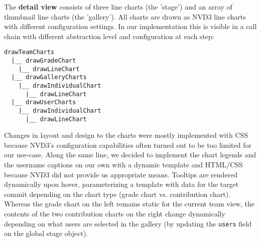 \documentclass[../manifest.tex]{subfiles}
\begin{document}
The \textbf{detail view} consists of three line charts (the 'stage') and an array of thumbnail line charts (the 'gallery'). All charts are drawn as NVD3 line charts with different configuration settings. In our implementation this is visible in a call chain with different abstraction level and configuration at each step:
\begin{verbatim}
drawTeamCharts
  |__ drawGradeChart
    |__ drawLineChart
  |__ drawGalleryCharts
    |__ drawIndividualChart
      |__ drawLineChart
  |__ drawUserCharts
    |__ drawIndividualChart
      |__ drawLineChart
\end{verbatim}

Changes in layout and design to the charts were mostly implemented with CSS because NVD3's configuration capabilities often turned out to be too limited for our use-case. Along the same line, we decided to implement the chart legends and the username captions on our own with a dynamic template and HTML/CSS because NVD3 did not provide us appropriate means. Tooltips are rendered dynamically upon hover, parameterizing a template with data for the target commit depending on the chart type (grade chart vs. contribution chart). Whereas the grade chart on the left remains static for the current team view, the contents of the two contribution charts on the right change dynamically depending on what users are selected in the gallery (by updating the \texttt{users} field on the global stage object).
\end{document}
